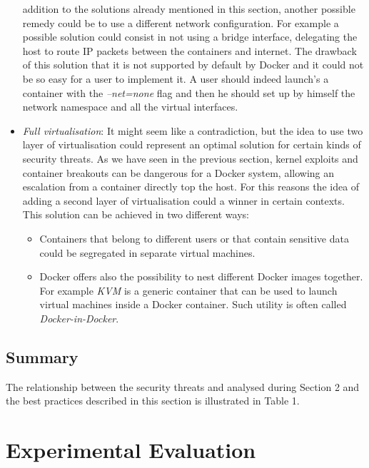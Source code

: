 \documentclass[a4paper,12pt]{article}
\begin{document}
\begin{itemize}
  addition to the solutions already mentioned in this section, another possible
  remedy could be to use a different network configuration. For example a
  possible solution could consist in not using a bridge interface, delegating
  the host to route IP packets between the containers and internet. The drawback
  of this solution that it is not supported by default by Docker and it could
  not be so easy for a user to implement it. A user should indeed launch's a
  container with the \textit{--net=none} flag and then he should set up by
  himself the network namespace and all the virtual interfaces.
  \item \textit{Full virtualisation}: It might seem like a contradiction, but
  the idea to use two layer of virtualisation could represent an optimal
  solution for certain kinds of security threats. As we have seen in the
  previous section, kernel exploits and container breakouts can be
  dangerous for a Docker system, allowing an escalation from a container
  directly top the host. For this reasons the idea of adding a second layer of
  virtualisation could a winner in certain contexts. This solution can be
  achieved in two different ways: 
  \begin{itemize}
    \item Containers that belong to different users or that contain sensitive
    data could be segregated in separate virtual machines. 
    \item Docker offers also the possibility to nest different Docker images
    together. For example \textit{KVM} \cite{kvm} is a generic container that
    can be used to launch virtual machines inside a Docker container. Such
    utility is often called \textit{Docker-in-Docker}.
  \end{itemize} 
\end{itemize}

\subsection{Summary}

The relationship between the security threats and analysed during Section 2 and the best practices described in
this section is illustrated in Table 1.

\newpage

\section{Experimental Evaluation}
\end{document}
